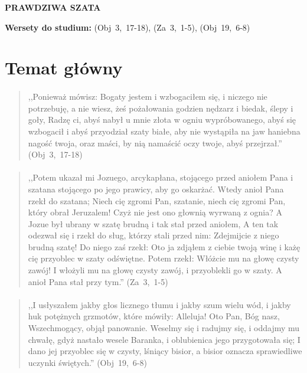 \documentclass[10pt,a4paper,oneside]{article}
\begin{document}
\centerline{\textbf{\MakeUppercase{Prawdziwa szata}}}
\begin{center}
\textbf{Wersety do studium:} 
\mbox{(Obj 3, 17-18)}, \mbox{(Za 3, 1-5)}, \mbox{(Obj 19, 6-8)}
\end{center}
\section{Temat główny}
\paragraph{}
\begin{quote}
,,Ponieważ mówisz: Bogaty jestem i wzbogaciłem się, i niczego nie potrzebuję, a nie wiesz, żeś pożałowania godzien nędzarz i biedak, ślepy i goły, Radzę ci, abyś nabył u mnie złota w ogniu wypróbowanego, abyś się wzbogacił i abyś przyodział szaty białe, aby nie wystąpiła na jaw haniebna nagość twoja, oraz maści, by nią namaścić oczy twoje, abyś przejrzał.'' \mbox{(Obj 3, 17-18)}
\end{quote}
\paragraph{}
\begin{quote}
,,Potem ukazał mi Jozuego, arcykapłana, stojącego przed aniołem Pana i szatana stojącego po jego prawicy, aby go oskarżać. Wtedy anioł Pana rzekł do szatana; Niech cię zgromi Pan, szatanie, niech cię zgromi Pan, który obrał Jeruzalem! Czyż nie jest ono głownią wyrwaną z ognia? A Jozue był ubrany w szatę brudną i tak stał przed aniołem, A ten tak odezwał się i rzekł do sług, którzy stali przed nim: Zdejmijcie z niego brudną szatę! Do niego zaś rzekł: Oto ja zdjąłem z ciebie twoją winę i każę cię przyoblec w szaty odświętne. Potem rzekł: Włóżcie mu na głowę czysty zawój! I włożyli mu na głowę czysty zawój, i przyoblekli go w szaty. A anioł Pana stał przy tym.'' \mbox{(Za 3, 1-5)}
\end{quote}
\paragraph{}
\begin{quote}
,,I usłyszałem jakby głos licznego tłumu i jakby szum wielu wód, i jakby huk potężnych grzmotów, które mówiły: Alleluja! Oto Pan, Bóg nasz, Wszechmogący, objął panowanie. Weselmy się i radujmy się, i oddajmy mu chwałę, gdyż nastało wesele Baranka, i oblubienica jego przygotowała się; I dano jej przyoblec się w czysty, lśniący bisior, a bisior oznacza sprawiedliwe uczynki świętych.'' \mbox{(Obj 19, 6-8)}
\end{quote}
\end{document}
